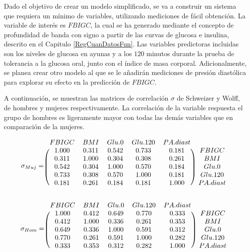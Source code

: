 Dado el objetivo de crear un modelo simplificado, se va a construir un sistema que requiera un mínimo de variables, utilizando mediciones de fácil obtención. La variable de interés es $FBIGC$, la cual se ha generado mediante el concepto de profundidad de banda con signo a partir de las curvas de glucosa e insulina, descrito en el Capitulo \ref{RegCuanDatosFun}. Las variables predictoras incluidas son los niveles de glucosa en ayunas y a los $120$ minutos durante la prueba de tolerancia a la glucosa oral, junto con el índice de masa corporal. Adicionalmente, se planea crear otro modelo al que se le añadirán mediciones de presión diastólica para explorar su efecto en la predicción de $FBIGC$.

A continuación, se muestran las matrices de correlación $\sigma$ de Schweizer y Wolff, de hombres y mujeres respectivamente. La correlación de la variable respuesta el grupo de hombres es ligeramente mayor con todas las demás variables que en comparación de la mujeres.

\[
\sigma_{Muj} = \begin{blockarray}{cccccc}
FBIGC      &      BMI      &    Glu.0      &  Glu.120      & PA.diast \\
\begin{block}{(ccccc)c}
1.000 & 0.311 & 0.542 &  0.733 & 0.181 & FBIGC \\
0.311 & 1.000 & 0.304 &  0.308 & 0.261 & BMI \\
0.542 & 0.304 & 1.000 &  0.570 & 0.184 & Glu.0 \\
0.733 & 0.308 & 0.570 &  1.000 & 0.181 & Glu.120 \\
0.181 & 0.261 & 0.184 &  0.181 & 1.000 & PA.diast \\
\end{block}
\end{blockarray}
 \]

\[
\sigma_{Hom} = \begin{blockarray}{cccccc}
FBIGC      &      BMI      &    Glu.0      &  Glu.120      & PA.diast \\
\begin{block}{(ccccc)c}
1.000 & 0.412 & 0.649 & 0.770 & 0.333 & FBIGC \\
0.412 & 1.000 & 0.336 & 0.261 & 0.353 & BMI \\
0.649 & 0.336 & 1.000 & 0.591 & 0.312 & Glu.0 \\
0.770 & 0.261 & 0.591 & 1.000 & 0.282 & Glu.120\\
0.333 & 0.353 & 0.312 & 0.282 & 1.000 & PA.diast \\
\end{block}
\end{blockarray}
 \]

